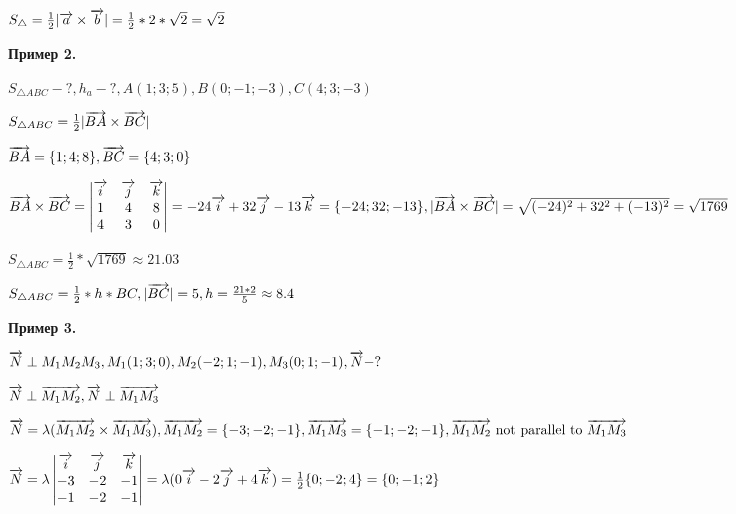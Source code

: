 \documentclass{article}
\def\vec{\ensuremath\overrightarrow}
\begin{document}
\begin{flushleft}
\hfill

$S_{\triangle} = \frac{1}{2} |\vec{a} \times \vec{b}| = \frac{1}{2} * 2 * \sqrt{2} = \sqrt{2}$

\hfill

\textbf{Пример 2.}

\hfill

$S_{\triangle A B C} - ?, h_{a} - ?, A(1; 3; 5), B(0; -1; -3), C(4; 3; -3)$

\hfill

$S_{\triangle A B C} = \frac{1}{2} |\vec{BA} \times \vec{BC}|$

$\vec{BA} = \{ 1; 4; 8 \}, \vec{BC} = \{ 4; 3; 0 \}$

$\vec{BA} \times \vec{BC} = \begin{vmatrix}
    \vec{i} & \vec{j} & \vec{k} \\
    1 & 4 & 8 \\
    4 & 3 & 0
\end{vmatrix} = -24\vec{i} + 32\vec{j} - 13\vec{k} = \{ -24; 32; -13 \}, |\vec{BA} \times \vec{BC}| = \sqrt{(-24)^2 + 32^2 + (-13)^2} = \sqrt{1769}$

\hfill

$S_{\triangle A B C} = \frac{1}{2} * \sqrt{1769} \approx 21.03$

$S_{\triangle ABC} = \frac{1}{2} * h * BC, |\vec{BC}| = 5, h = \frac{21 * 2}{5} \approx 8.4$

\hfill

\textbf{Пример 3.}

\hfill

$\vec{N} \perp M_1 M_2 M_3, M_1 (1; 3; 0), M_2 (-2; 1; -1), M_3 (0; 1; -1), \vec{N} - ?$

\hfill

$\vec{N} \perp \vec{M_1 M_2}, \vec{N} \perp \vec{M_1 M_3}$

\hfill

$\vec{N} = \lambda (\vec{M_1 M_2} \times \vec{M_1 M_3}), \vec{M_1 M_2} = \{ -3; -2; -1\}, \vec{M_1 M_3} = \{-1; -2; -1 \}, \vec{M_1 M_2} \text{ not parallel to } \vec{M_1 M_3}$

\hfill

$\vec{N} = \lambda \begin{vmatrix}
    \vec{i} & \vec{j} & \vec{k} \\
    -3 & -2 & -1 \\
    -1 & -2 & -1
\end{vmatrix} = \lambda (0\vec{i} - 2\vec{j} + 4\vec{k}) = \frac{1}{2} \{0; -2; 4 \} = \{ 0; -1; 2 \}$


\end{flushleft}
\end{document}

